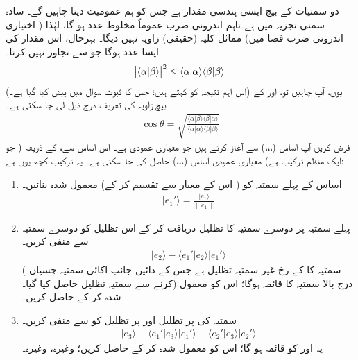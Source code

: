 دو  سمتیات کے بیچ    ایسی    ہندسی مقدار  ہے جس کو ہم عمومیت دینا چاہیں گے۔ سادہ سمتی تجزیہ میں 
  ہے۔تاہم    اندرونی ضرب  عموماً مخلوط عدد ہو گا،    لہٰذا  (  اختیاری اندرونی ضرب فضا میں) مماثل کلیہ  (حقیقی)  زاویہ  نہیں دیگا۔ بہرحال،  اس مقدار کی    ایسا  عدد ہوگا جو  سے تجاوز نہیں کرتا۔  
\begin{align}\label{مساوات_ضمیمہ_شوارز_عدم_مساوات}
	\abs{\langle\alpha|\beta\rangle}^2\leq\langle\alpha|\alpha\rangle\langle\beta|\beta\rangle
\end{align}
(اس اہم نتیجہ کو   کہتے ہیں؛  جس کا ثبوت سوال  میں پیش کیا گیا ہے۔)  یوں،  آپ چاہیں تو،   اور  کے بیچ زاویہ کی  تعریف درج ذیل  لی جا سکتی ہے۔
\begin{align}\label{مساوات_ضمیمہ_زاویہ}
	\cos\theta = \sqrt{\frac{\langle\alpha|\beta\rangle\langle\beta|\alpha\rangle}{\langle\alpha|\alpha\rangle\langle\beta|\beta\rangle}}
\end{align}
فرض کریں آپ اساس (،،،)  سے آغاز کرتے ہیں جو معیاری عمودی  ہے۔ اس اساس سے،    کے ذریعہ ( جو ایک منظم ترکیب ہے)      معیاری عمودی اساس (،،،)    حاصل کی جا سکتی ہے۔ یہ ترکیب  کچھ یوں ہے:
\begin{enumerate}[a]
\item
  اساس کے پہلے سمتیہ   کو  ( اس کے معیار سے تقسیم کر کے)   معمول شدہ  بنائیں۔
\begin{align*}
		|e_1'\rangle = \frac{|e_1\rangle}{\|e_1\|}
\end{align*}
\item
 پہلے سمتیہ پر دوسرے سمتیہ کا تظلیل  دریافت کر کے اس تظلیل کو دوسرے سمتیہ سے منفی کریں۔
\begin{align*}
	|e_2\rangle-\langle e_1'|e_2\rangle|e_1'\rangle
\end{align*}
( سمتیہ  کا  کے رخ غیر سمتیہ تظلیل   ہے جس کے دائیں جانب اکائی سمتیہ   چسپاں کرنے سے سمتیہ تظلیل حاصل  کیا گیا۔) درج بالا  سمتیہ  کا قائمہ ہوگا؛ اس کو معمول شدہ  کر کے  حاصل کریں۔
\item
سمتیہ   کی  پر تظلیل  اور  پر تظلیل کو  سے منفی کریں۔
\begin{align*}
|e_3\rangle-\langle e_1'|e_3\rangle|e_1'\rangle-\langle e_2'|e_3\rangle|e_2'\rangle
\end{align*}
یہ  اور  کو قائمہ ہو گا؛ اس کو معمول شدہ کر کے  حاصل کریں؛ وغیرہ، وغیرہ۔
\end{enumerate}


